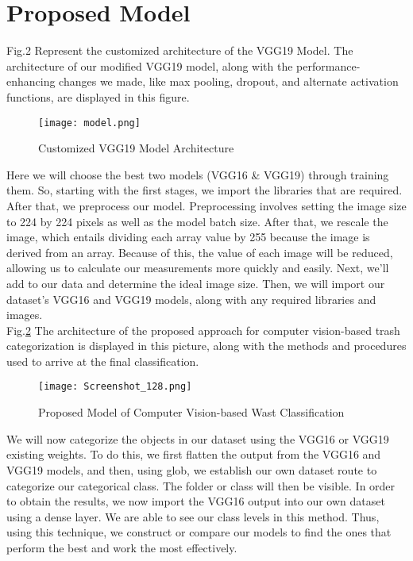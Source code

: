 \documentclass[conference]{IEEEtran}
\begin{document}
\section{Proposed Model}
Fig.2 Represent the customized architecture of the VGG19 Model. The architecture of our modified VGG19 model, along with the performance-enhancing changes we made, like max pooling, dropout, and alternate activation functions, are displayed in this figure.

\begin{figure}[htp]
        \begin{center}
        \texttt{[image: model.png]}
        \end{center}
        \caption{Customized VGG19 Model Architecture}
        \label{fig: Customized VGG19 Model Architecture}
        \end{figure}

Here we will choose the best two models (VGG16 & VGG19) through training them. So, starting with the first stages, we import the libraries that are required. After that, we preprocess our model. Preprocessing involves setting the image size to 224 by 224 pixels as well as the model batch size. After that, we rescale the image, which entails dividing each array value by 255 because the image is derived from an array. Because of this, the value of each image will be reduced, allowing us to calculate our measurements more quickly and easily. Next, we'll add to our data and determine the ideal image size. Then, we will import our dataset's VGG16 and VGG19 models, along with any required libraries and images.
\vspace{1mm}\\

Fig.\ref{fig: Proposed Methodology} The architecture of the proposed approach for computer vision-based trash categorization is displayed in this picture, along with the methods and procedures used to arrive at the final classification.

\begin{figure}[htp]
        \begin{center}
        \texttt{[image: Screenshot\_128.png]}
        \end{center}
        \caption{Proposed Model of Computer Vision-based Wast Classification}
        \label{fig: Proposed Methodology}
        \end{figure}

We will now categorize the objects in our dataset using the VGG16 or VGG19 existing weights. To do this, we first flatten the output from the VGG16 and VGG19 models, and then, using glob, we establish our own dataset route to categorize our categorical class. The folder or class will then be visible. In order to obtain the results, we now import the VGG16 output into our own dataset using a dense layer. We are able to see our class levels in this method.
Thus, using this technique, we construct or compare our models to find the ones that perform the best and work the most effectively.
\end{document}
